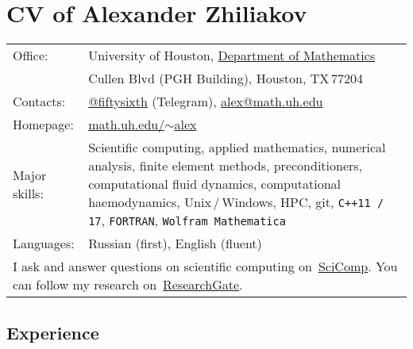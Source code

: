 \documentclass[a4paper,12pt]{article}
\begin{document}
	\section*{CV of Alexander Zhiliakov}
	
	\begin{longtable}{ l >{\raggedright\arraybackslash}p{15cm} }
		Office:			& University of Houston, \href{http://www.uh.edu/nsm/math/}{Department of Mathematics}\\
		\phantom{Summer 2018} & 3551 Cullen Blvd (PGH Building), Houston, TX\,77204 \vspace{2mm}\\
		Contacts:		& \href{https://telegram.me/fiftysixth}{@fiftysixth} (Telegram), \href{mailto:alex@math.uh.edu}{alex@math.uh.edu} \vspace{2mm}\\
		Homepage:		& \href{https://www.math.uh.edu/~alex}{math.uh.edu/${\sim}$alex} \vspace{2mm}\\
		Major skills:	& Scientific computing, applied mathematics, numerical analysis, finite element methods, preconditioners, computational fluid dynamics, computational haemodynamics, Unix\,/\,Windows, HPC, git, \texttt{C++11\,/\,17}, \texttt{FORTRAN}, \texttt{Wolfram Mathematica}\vspace{2mm}\\
		Languages:		& Russian (first), English (fluent) \vspace{3mm}\\
		\multicolumn{2}{p{17cm}}{I ask and answer questions on scientific computing on~\href{https://scicomp.stackexchange.com/users/21916/56th}{SciComp}. You can follow my research on~\href{https://www.researchgate.net/profile/Alexander_Zhiliakov}{ResearchGate}.}\\
	\end{longtable} 
	
	\subsection*{Experience}
	
\end{document}
